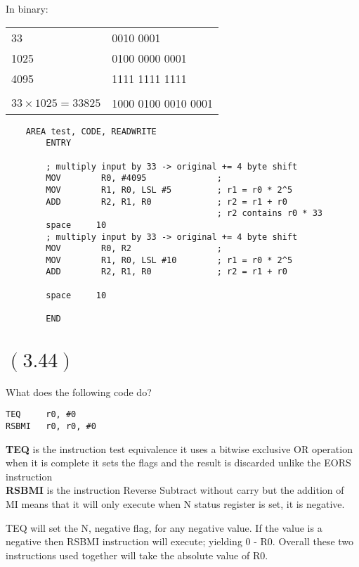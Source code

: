 \documentclass[letterpaper,12pt,titlepage]{article}
\begin{document}
\begin{mdframed}[style=MyFrame]
In binary: \\
\begin{tabular}{l l }
33 & 0010 0001 \\
1025 & 0100 0000 0001 \\
4095 & 1111 1111 1111 \\ \\
$33\times 1025 = 33825$ & 1000 0100 0010 0001
\end{tabular}

\begin{verbatim}
    AREA test, CODE, READWRITE    
        ENTRY
        
        ; multiply input by 33 -> original += 4 byte shift
        MOV        R0, #4095              ; 
        MOV        R1, R0, LSL #5         ; r1 = r0 * 2^5 
        ADD        R2, R1, R0             ; r2 = r1 + r0
                                          ; r2 contains r0 * 33
        space     10                            
        ; multiply input by 33 -> original += 4 byte shift
        MOV        R0, R2                 ; 
        MOV        R1, R0, LSL #10        ; r1 = r0 * 2^5 
        ADD        R2, R1, R0             ; r2 = r1 + r0
        
        space     10
    
        END
\end{verbatim}
\end{mdframed}

\section*{$(3.44)$} What does the following code do?
\begin{verbatim}
TEQ     r0, #0
RSBMI   r0, r0, #0
\end{verbatim}

\begin{mdframed}[style=MyFrame]
\textbf{TEQ} is the instruction test equivalence it uses a bitwise exclusive OR operation when it is complete it sets the flags and the result is discarded unlike the EORS instruction\\
\textbf{RSBMI} is the instruction Reverse Subtract without carry but the addition of MI means that it will only execute when N status register is set, it is negative. 

TEQ will set the N, negative flag, for any negative value. If the value is a negative then RSBMI instruction will execute; yielding 0 - R0. Overall these two instructions used together will take the absolute value of R0.
\end{mdframed}
\end{document}
